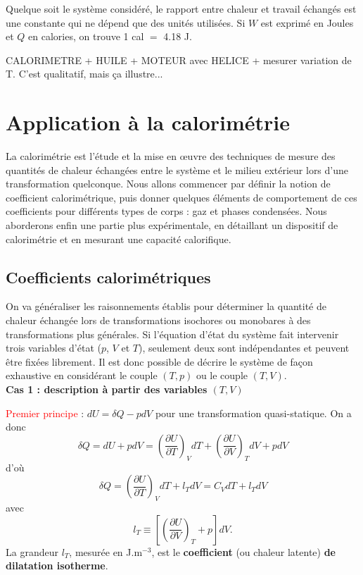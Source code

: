 \documentclass[11pt,a4paper]{report}
\begin{document}
Quelque soit le système considéré, le rapport entre chaleur et travail échangés est une constante qui ne dépend que des unités utilisées. Si $W$ est exprimé en Joules et $Q$ en calories, on trouve 1 cal $=$ 4.18 J.

CALORIMETRE + HUILE + MOTEUR avec HELICE + mesurer variation de T. C'est qualitatif, mais ça illustre...


\newpage
\section{Application à la calorimétrie}

La calorimétrie est l'étude et la mise en œuvre des techniques de mesure des quantités de chaleur échangées entre le système et le milieu extérieur lors d'une transformation quelconque. Nous allons commencer par définir la notion de coefficient calorimétrique, puis donner quelques éléments de comportement de ces coefficients pour différents types de corps : gaz et phases condensées. Nous aborderons enfin une partie plus expérimentale, en détaillant un dispositif de calorimétrie et en mesurant une capacité calorifique.

\subsection{Coefficients calorimétriques}

On va généraliser les raisonnements établis pour déterminer la quantité de chaleur échangée lors de transformations isochores ou monobares à des transformations plus générales. Si l'équation d'état du système fait intervenir trois variables d'état ($p$, $V$ et $T$), seulement deux sont indépendantes et peuvent être fixées librement. Il est donc possible de décrire le système de façon exhaustive en considérant le couple $(T,p)$ ou le couple $(T,V)$.\\

\textbf{Cas 1 : description à partir des variables $(T,V)$}

\textcolor{red}{Premier principe} : $dU = \delta Q - pdV$ pour une transformation quasi-statique.
On a donc
\begin{equation}
	\delta Q = dU + pdV = \left(\frac{\partial U}{\partial T}\right)_V dT + \left(\frac{\partial U}{\partial V}\right)_T dV + pdV
\end{equation}
d'où
\begin{equation}
	\delta Q = \left(\frac{\partial U}{\partial T}\right)_V dT + l_T dV = C_V dT + l_T dV
\end{equation}
avec
\begin{equation}
	l_T \equiv \left[\left(\frac{\partial U}{\partial V}\right)_T + p\right]dV.
\end{equation}
La grandeur $l_T$, mesurée en J.m$^{-3}$, est le \textbf{coefficient} (ou chaleur latente) \textbf{de dilatation isotherme}.\\
\end{document}
